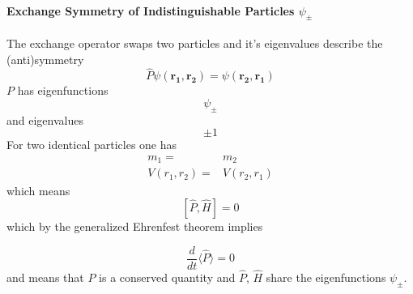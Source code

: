 \paragraph[Exchange Symmetry of psi]{Exchange Symmetry of Indistinguishable Particles $\psi_{\pm}$}

\newpar{}

The exchange operator swaps two particles and it's eigenvalues describe the (anti)symmetry
\begin{equation*}
    \widehat{P}\psi(\mathbf{r_1},\mathbf{r_2})=\psi(\mathbf{r_2},\mathbf{r_1})
\end{equation*}
$P$ has eigenfunctions
\begin{equation*}
    \psi_{\pm}
\end{equation*}
and eigenvalues
\begin{equation*}
    \pm 1
\end{equation*}
For two identical particles one has
\begin{align*}
    m_1=        & m_2        \\
    V(r_1,r_2)= & V(r_2,r_1)
\end{align*}
which means
\begin{equation*}
    \left[\widehat{P},\widehat{H}\right]=0
\end{equation*}
which by the generalized Ehrenfest theorem implies

\begin{equation*}
    \frac{d}{dt}\langle\widehat{P}\rangle=0
\end{equation*}
and means that $P$ is a conserved quantity and $\widehat{P}$, $\widehat{H}$ share the eigenfunctions $\psi_{\pm}$.


